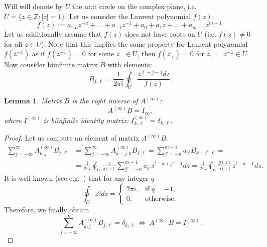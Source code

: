 \documentclass{article}
\newtheorem{lemma}{Lemma}
\begin{document}
	Will will denote by $U$ the unit circle on the complex plane, i.e. $U = \{z\in\mathbb{Z}: |z| = 1\}$.
	Let us consider the Laurent polynomial $f(z)$:
	\[
	f(z) := a_{-n}z^{-n} + \dots + a_{-1}z^{-1} + a_0 + a_1 z + \dots +a_{m-1}z^{m-1}.
	\]
	Let us additionally assume that $f(z)$ does not have roots on $U$ (i.e. $f(z) \neq 0$ for all $z \in U$).
	Note that this implies the same property for Laurent polynomial $f(z^{-1})$ as if $f(z_-^{-1}) = 0$ for some $z_- \in U$, then $f(z_+) = 0$ for $z_+ = z^{-1}_- \in U$.
	Now consider biinfinite matrix $B$ with elements:
	\begin{equation}\label{eq:B}
	B_{j,\ell} = \frac{1}{2\pi i} \oint_U \frac{z^{\ell - j-1}dz}{f(z)}.
	\end{equation}
	\begin{lemma} Matrix $B$ is the right inverse of $A^{(\infty)}$:
	\[
	A^{(\infty)}B = I_{\infty},
	\]
	where $I^{(\infty)}$ is biinfinite identity matrix: $I^{(\infty)}_{k,\ell} = \delta_{k,\ell}$.
	\end{lemma}
	\begin{proof}
	Let us compute an element of matrix $A^{(\infty)}B$:
	\begin{align*}
	\sum_{j=-\infty}^{\infty}A^{(\infty)}_{k, j}B_{j, \ell}
	&=
	\sum_{j=-\infty}^{\infty}A^{(\infty)}_{k-j, 0}B_{j, \ell}
	=
	\sum_{j'=-n}^{m-1}a_{j'}B_{k-j', \ell}
	=\\&=
	\frac{1}{2\pi i}\oint_U\frac{1}{g(z)}\sum_{j'=-n}^{m-1}a_{j'}z^{l-k+j'-1}dz
	=
	\frac{1}{2\pi i}\oint_U\frac{g(z)}{g(z)}z^{l-k-1}dz.
	\end{align*}
	It is well known (see e.g.~\cite{somebody}) that for any integer $q$
	\[
	\oint_U z^{q}dz
	=
	\begin{cases}
	2\pi i,&\text{if } q = -1,\\
	0,&\text{otherwise}.
	\end{cases}
	\]
	Therefore, we finally obtain
	\[
	\sum_{j=-\infty}^{\infty}A^{(\infty)}_{k, j}B_{j, \ell} = \delta_{k,\ell} ~\Longleftrightarrow~A^{(\infty)}B = I^{(\infty)}.
	\]
	\end{proof}
	
\end{document}
